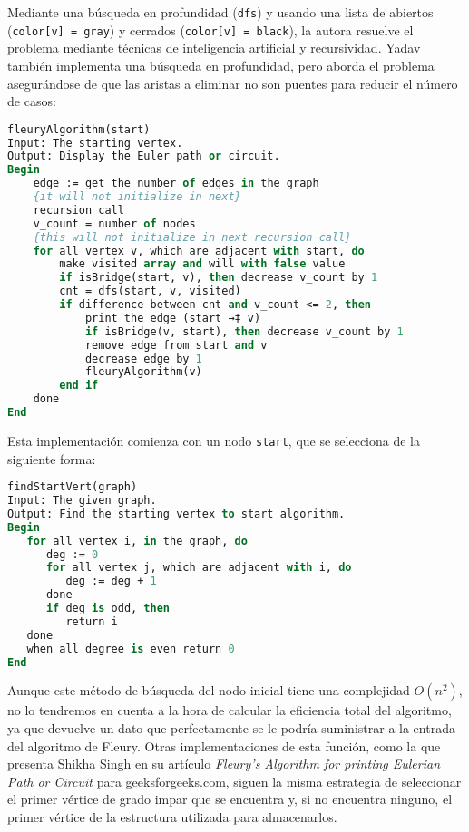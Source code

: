 Mediante una búsqueda en profundidad (\texttt{dfs}) y usando una lista de abiertos (\texttt{color[v] = gray}) y cerrados (\texttt{color[v] = black}), la autora resuelve el problema mediante técnicas de inteligencia artificial y recursividad.
Yadav también implementa una búsqueda en profundidad, pero aborda el problema asegurándose de que las aristas a eliminar no son puentes para reducir el número de casos:

\begin{lstlisting}[language=Pascal]
fleuryAlgorithm(start)
Input: The starting vertex.
Output: Display the Euler path or circuit.
Begin
	edge := get the number of edges in the graph
	{it will not initialize in next}
	recursion call
	v_count = number of nodes
	{this will not initialize in next recursion call}
	for all vertex v, which are adjacent with start, do
		make visited array and will with false value
		if isBridge(start, v), then decrease v_count by 1
		cnt = dfs(start, v, visited)
		if difference between cnt and v_count <= 2, then
			print the edge (start →‡ v)
			if isBridge(v, start), then decrease v_count by 1
			remove edge from start and v
			decrease edge by 1
			fleuryAlgorithm(v)
		end if
	done
End
\end{lstlisting}

Esta implementación comienza con un nodo \texttt{start}, que se selecciona de la siguiente forma:

\begin{lstlisting}[language=Pascal]
findStartVert(graph)
Input: The given graph.
Output: Find the starting vertex to start algorithm.
Begin
   for all vertex i, in the graph, do
      deg := 0
      for all vertex j, which are adjacent with i, do
         deg := deg + 1
      done
      if deg is odd, then
         return i
   done
   when all degree is even return 0
End
\end{lstlisting}

Aunque este método de búsqueda del nodo inicial tiene una complejidad $O(n^2)$, no lo tendremos en cuenta a la hora de calcular la eficiencia total del algoritmo, ya que devuelve un dato que perfectamente se le podría suministrar a la entrada del algoritmo de Fleury.
Otras implementaciones de esta función, como la que presenta Shikha Singh en su artículo \textit{Fleury’s Algorithm for printing Eulerian Path or Circuit} para \url{geeksforgeeks.com}, siguen la misma estrategia de seleccionar el primer vértice de grado impar que se encuentra y, si no encuentra ninguno, el primer vértice de la estructura utilizada para almacenarlos.

